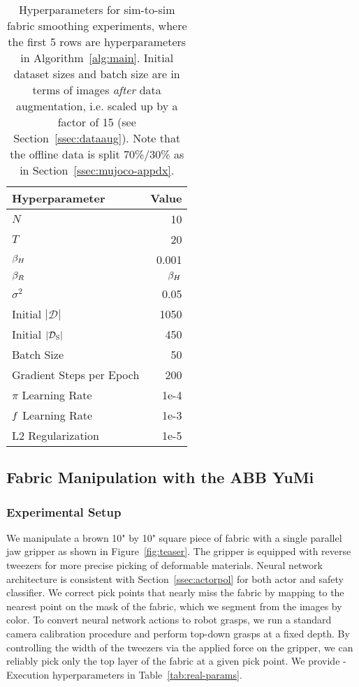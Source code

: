 \begin{table}[!htbp]
\centering
{
 \begin{tabular}{l r} 
Hyperparameter & Value \\
\hline
$N$ & 10 \\
$T$ & 20 \\
$\beta_{H}$ & 0.001 \\
$\beta_{R}$ & $\beta_{H}$  \\
$\sigma^2$ & 0.05 \\
Initial $|\mathcal{D}|$ & 1050 \\
Initial $|\mathcal{D}_{\rm S}|$ & 450 \\
Batch Size & 50 \\
Gradient Steps per Epoch & 200 \\
$\pi$ Learning Rate & 1e-4 \\
$f$ Learning Rate & 1e-3 \\
L2 Regularization & 1e-5 \\
\end{tabular}}
\caption{Hyperparameters for sim-to-sim fabric smoothing experiments, where the first 5 rows are \algabbr hyperparameters in Algorithm~\ref{alg:main}. Initial dataset sizes and batch size are in terms of images \textit{after} data augmentation, i.e. scaled up by a factor of 15 (see Section~\ref{ssec:dataaug}). Note that the offline data is split 70\%/30\% as in Section~\ref{ssec:mujoco-appdx}.}
\label{tab:s2s-params}
\end{table}

\subsection{Fabric Manipulation with the ABB YuMi}
\subsubsection{Experimental Setup}
We manipulate a brown 10" by 10" square piece of fabric with a single parallel jaw gripper as shown in Figure~\ref{fig:teaser}. The gripper is equipped with reverse tweezers for more precise picking of deformable materials. Neural network architecture is consistent with Section~\ref{ssec:actorpol} for both actor and safety classifier. We correct pick points that nearly miss the fabric by mapping to the nearest point on the mask of the fabric, which we segment from the images by color. To convert neural network actions to robot grasps, we run a standard camera calibration procedure and perform top-down grasps at a fixed depth. By controlling the width of the tweezers via the applied force on the gripper, we can reliably pick only the top layer of the fabric at a given pick point. We provide \algabbr-Execution hyperparameters in Table~\ref{tab:real-params}. %

